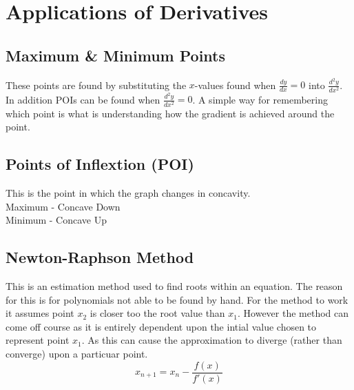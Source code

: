 \documentclass[a5paper]{article}
\begin{document}
	\section{Applications of Derivatives}
	\subsection{Maximum \& Minimum Points}
	\begin{center}
	\end{center}
	These points are found by substituting the $x$-values found when $\frac{dy}{dx}=0$ into $\frac{d^{2}y}{dx^{2}}$. In addition POIs can be found when $\frac{d^{2}y}{dx^{2}}=0$. A simple way for remembering which point is what is understanding how the gradient is achieved around the point.

	\subsection{Points of Inflextion (POI)}
	This is the point in which the graph changes in concavity.\\
	Maximum - Concave Down\\
	Minimum - Concave Up

	\subsection{Newton-Raphson Method}
	This is an estimation method used to find roots within an equation. The reason for this is for polynomials not able to be found by hand. For the method to work it assumes point $x_{2}$ is closer too the root value than $x_{1}$. However the method can come off course as it is entirely dependent upon the intial value chosen to represent point $x_{1}$. As this can cause the approximation to diverge (rather than converge) upon a particuar point.
	$$x_{n+1}=x_{n}-\frac{f(x)}{f'(x)}$$
\end{document}
